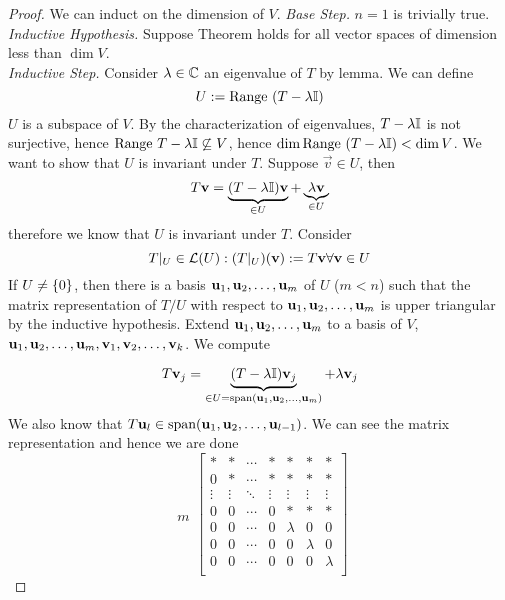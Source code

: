 \begin{proof} 
    We can induct on the dimension of $V$. 
    \textit{Base Step.} $n = 1$ is trivially true. \\
    \textit{Inductive Hypothesis.} Suppose Theorem holds for all vector spaces of dimension less than $\dim V$. \\
    \textit{Inductive Step.} Consider $\lambda \in \mathbb C$ an eigenvalue of $T$ by lemma. We can define 
    \[U := \text{Range } (T  -\lambda \mathbb I)\] 
    $U$ is a subspace of $V$. By the characterization of eigenvalues, $T - \lambda \mathbb I$ is not surjective, hence $\text{Range } T - \lambda \mathbb I \not\subseteq V$, hence $\dim \text{Range } (T - \lambda \mathbb I) < \dim V$.
    We want to show that $U$ is invariant under $T$. Suppose $\vec v \in U$, then \[T\mathbf v = \underbrace{(T - \lambda \mathbb I)\mathbf v}_{\in U} + \underbrace{\lambda \mathbf v}_{\in U}\] therefore we know that $U$ is invariant under $T$. 
    Consider \[T|_U \in \mathcal L(U) : (T|_U)(\mathbf v) := T\mathbf  v \forall \mathbf v \in U\] 
    If $U \neq \left\{ 0 \right\}$, then there is a basis ${\mathbf u}_1,{\mathbf u}_2, \ldots, {\mathbf u}_{m}$ of $U$ ($m < n$) such that the matrix representation of $T/U$ with respect to ${\mathbf u}_1,{\mathbf u}_2, \ldots, {\mathbf u}_{m}$ is upper triangular by the inductive hypothesis. Extend ${\mathbf u}_1,{\mathbf u}_2, \ldots, {\mathbf u}_{m}$ to a basis of $V$, ${\mathbf u}_1,{\mathbf u}_2, \ldots, {\mathbf u}_{m}, {\mathbf v}_1,{\mathbf v}_2, \ldots, {\mathbf v}_{k}$. We compute

    \[T\mathbf v_j = \underbrace{(T - \lambda \mathbb I)\mathbf v_j}_{\in U = \text{span} ({\mathbf u}_1,{\mathbf u}_2, \ldots, {\mathbf u}_{m})} + \lambda \mathbf v_j\] We also know that $T\mathbf u_l \in \text{span} ({\mathbf u}_1,{\mathbf u}_2, \ldots, {\mathbf u}_{l-1})$. We can see the matrix representation and hence we are done
    \[ \begin{array}{cc}
         \\ \\ \\ \\ m \\ \\ \\ 
    \end{array}\left[\begin{array}{cccc|ccccccc}
         * & * & \cdots & * & * & * & * \\
         0 & * & \cdots & * & * & * & * \\
         \vdots & \vdots & \ddots & \vdots & \vdots & \vdots & \vdots \\
         0 & 0 & \cdots & 0 & * & * & * \\
         \hline
         0 & 0 & \cdots & 0 & \lambda & 0 & 0 \\
         0 & 0 & \cdots & 0 & 0 & \lambda & 0 \\
         0 & 0 & \cdots & 0 & 0 & 0 & \lambda \\
    \end{array}\right]\]
\end{proof}
